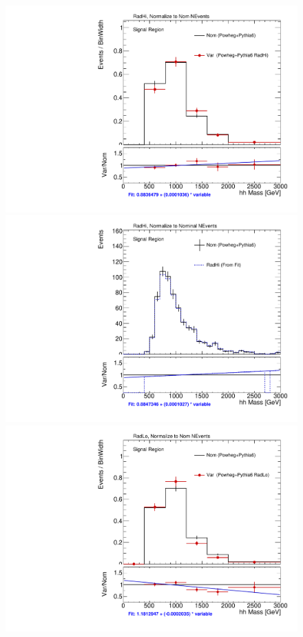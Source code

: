 \begin{figure}[!htbp]
\begin{center}
\includegraphics[scale=0.25]{./figures/boosted/systematics/ttbar_alt_hhMass_SR_RadHi_rebin} 
\includegraphics[scale=0.25]{./figures/boosted/systematics/ttbar_fromfit_hhMass_SR_RadHi}  \\
\includegraphics[scale=0.25]{./figures/boosted/systematics/ttbar_alt_hhMass_SR_RadLo_rebin}

\end{center}
\end{figure}
